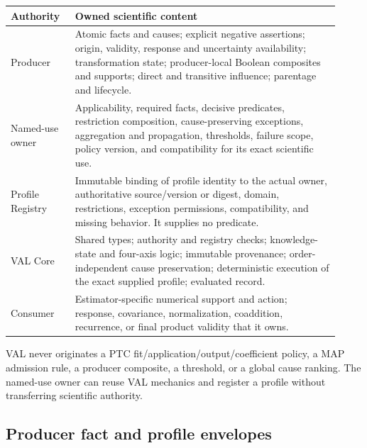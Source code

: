 \begin{center}
\begin{tabular}{p{0.18\linewidth}p{0.74\linewidth}}
\toprule
Authority & Owned scientific content \\
\midrule
Producer & Atomic facts and causes; explicit negative assertions; origin,
validity, response and uncertainty availability; transformation state;
producer-local Boolean composites and supports; direct and transitive
influence; parentage and lifecycle. \\
Named-use owner & Applicability, required facts, decisive predicates,
restriction composition, cause-preserving exceptions, aggregation and
propagation, thresholds, failure scope, policy version, and compatibility for
its exact scientific use. \\
Profile Registry & Immutable binding of profile identity to the actual owner,
authoritative source/version or digest, domain, restrictions, exception
permissions, compatibility, and missing behavior. It supplies no predicate. \\
VAL Core & Shared types; authority and registry checks; knowledge-state and
four-axis logic; immutable provenance; order-independent cause preservation;
deterministic execution of the exact supplied profile; evaluated record. \\
Consumer & Estimator-specific numerical support and action; response,
covariance, normalization, coaddition, recurrence, or final product validity
that it owns. \\
\bottomrule
\end{tabular}
\end{center}

VAL never originates a PTC fit/application/output/coefficient policy, a MAP
admission rule, a producer composite, a threshold, or a global cause ranking.
The named-use owner can reuse VAL mechanics and register a profile without
transferring scientific authority.

\subsection{Producer fact and profile envelopes}

